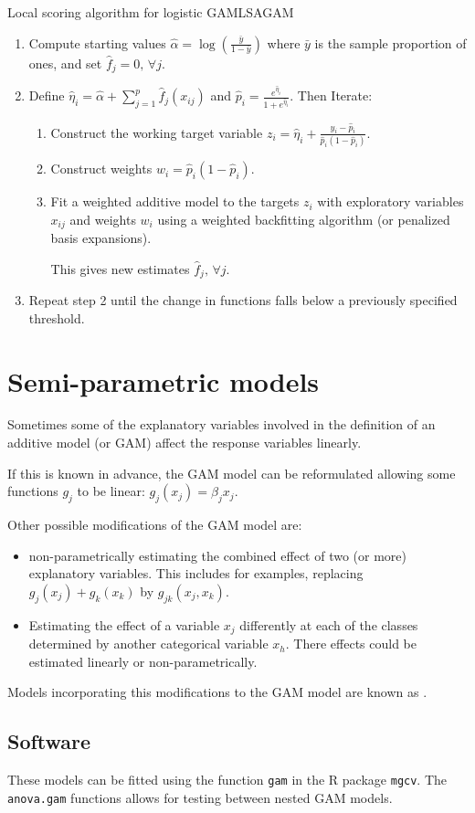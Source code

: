 \begin{algorithm}{Local scoring algorithm for logistic GAM}{LSAGAM}
\begin{enumerate}
    \item Compute starting values $\hat \alpha = \log \left( \frac{\bar y}{1-\bar y} \right)$
        where $\bar y$ is the sample proportion of ones, and set $\hat f_j = 0,\,\forall j$.
    \item Define $\hat \eta_i = \hat \alpha + \sum_{j=1}^p \hat f_j(x_{ij})$ and
        $\hat p_i = \frac{e^{\hat \eta_i}}{1+e^{\hat \eta_i}}$.
    Then Iterate:
        \begin{enumerate}
            \item Construct the working target variable $z_i = \hat \eta_i + \frac{y_i - \hat p_i}{\hat p_i(1-\hat p_i)}$.
            \item Construct weights $w_i = \hat p_i(1-\hat p_i)$.
            \item Fit a weighted additive model to the targets $z_i$ with
                exploratory variables $x_{ij}$ and weights $w_i$ using
                a weighted backfitting algorithm (or penalized basis expansions).

                This gives new estimates $\hat f_j,\,\forall j$.
        \end{enumerate}
        \item Repeat step 2 until the change in functions falls below a previously
            specified threshold.
\end{enumerate}
\end{algorithm}

\pagebreak
\section{Semi-parametric models}

Sometimes some of the explanatory variables involved in the
definition of an additive model (or GAM)
affect the response variables linearly.

If this is known in advance, the GAM model can be reformulated
allowing some functions $g_j$ to be linear:
$g_j(x_j) = \beta_j x_j$.

Other possible modifications of the GAM model are:
\begin{itemize}
    \item non-parametrically estimating the combined effect of two (or more)
        explanatory variables. This includes for examples, replacing
        $g_j(x_j) + g_k(x_k)$ by $g_{jk}(x_j, x_k)$.
    \item Estimating the effect of a variable $x_j$ differently at each of the
        classes determined by another categorical variable $x_h$. There
        effects could be estimated linearly or non-parametrically.
\end{itemize}

Models incorporating this modifications to the GAM model are known as
.

\subsection{Software}

These models can be fitted using the function \texttt{gam} in the R package
\texttt{mgcv}. The \texttt{anova.gam} functions allows for testing between
nested GAM models.
